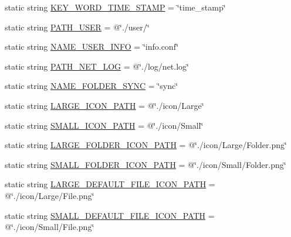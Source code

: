 \begin{DoxyCompactItemize}
static string \hyperlink{classcustom__cloud_1_1_my_config_a94f5074f7b164c53ca2403c8c9438411}{K\+E\+Y\+\_\+\+W\+O\+R\+D\+\_\+\+T\+I\+M\+E\+\_\+\+S\+T\+A\+MP} = \char`\"{}time\+\_\+stamp\char`\"{}
\item 
static string \hyperlink{classcustom__cloud_1_1_my_config_a655fe70f297874f9c678c90121a77903}{P\+A\+T\+H\+\_\+\+U\+S\+ER} = @\char`\"{}./user/\char`\"{}
\item 
static string \hyperlink{classcustom__cloud_1_1_my_config_a2a34944b68fd282ae47999897606f640}{N\+A\+M\+E\+\_\+\+U\+S\+E\+R\+\_\+\+I\+N\+FO} = \char`\"{}info.\+conf\char`\"{}
\item 
static string \hyperlink{classcustom__cloud_1_1_my_config_a5b31908095ea37bf753dffd44e35889b}{P\+A\+T\+H\+\_\+\+N\+E\+T\+\_\+\+L\+OG} = @\char`\"{}./log/net.\+log\char`\"{}
\item 
static string \hyperlink{classcustom__cloud_1_1_my_config_a6da677e1f626bfb99170d3161f2426a5}{N\+A\+M\+E\+\_\+\+F\+O\+L\+D\+E\+R\+\_\+\+S\+Y\+NC} = \char`\"{}sync\char`\"{}
\item 
static string \hyperlink{classcustom__cloud_1_1_my_config_a88478345f3bc89b6dd7edf0aab20ba89}{L\+A\+R\+G\+E\+\_\+\+I\+C\+O\+N\+\_\+\+P\+A\+TH} = @\char`\"{}./icon/Large\char`\"{}
\item 
static string \hyperlink{classcustom__cloud_1_1_my_config_a033411e08af032078b621b22f046234e}{S\+M\+A\+L\+L\+\_\+\+I\+C\+O\+N\+\_\+\+P\+A\+TH} = @\char`\"{}./icon/Small\char`\"{}
\item 
static string \hyperlink{classcustom__cloud_1_1_my_config_a9dda17e1a6bedd3fcc8b9d024bb50f0c}{L\+A\+R\+G\+E\+\_\+\+F\+O\+L\+D\+E\+R\+\_\+\+I\+C\+O\+N\+\_\+\+P\+A\+TH} = @\char`\"{}./icon/Large/Folder.\+png\char`\"{}
\item 
static string \hyperlink{classcustom__cloud_1_1_my_config_acaa2b3508412e1e319cc1e752a0565f3}{S\+M\+A\+L\+L\+\_\+\+F\+O\+L\+D\+E\+R\+\_\+\+I\+C\+O\+N\+\_\+\+P\+A\+TH} = @\char`\"{}./icon/Small/Folder.\+png\char`\"{}
\item 
static string \hyperlink{classcustom__cloud_1_1_my_config_aa7772922fd641ad9ff2d69acf9d72a26}{L\+A\+R\+G\+E\+\_\+\+D\+E\+F\+A\+U\+L\+T\+\_\+\+F\+I\+L\+E\+\_\+\+I\+C\+O\+N\+\_\+\+P\+A\+TH} = @\char`\"{}./icon/Large/File.\+png\char`\"{}
\item 
static string \hyperlink{classcustom__cloud_1_1_my_config_a71e2f1312aaf4c83b1d4f36f034262ad}{S\+M\+A\+L\+L\+\_\+\+D\+E\+F\+A\+U\+L\+T\+\_\+\+F\+I\+L\+E\+\_\+\+I\+C\+O\+N\+\_\+\+P\+A\+TH} = @\char`\"{}./icon/Small/File.\+png\char`\"{}
\item 

\end{DoxyCompactItemize}
